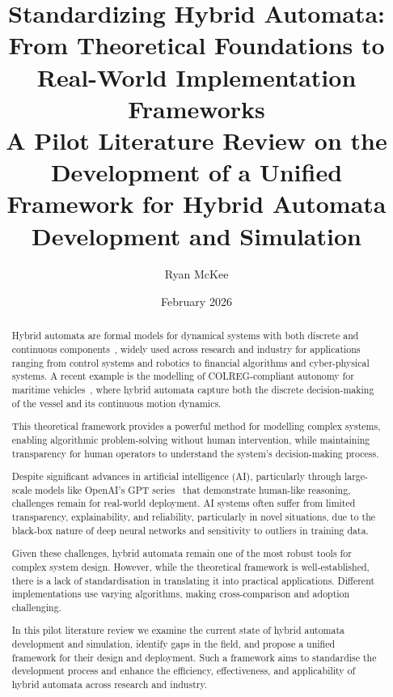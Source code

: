 \documentclass[a4paper, 12pt]{report}
\title{
    Standardizing Hybrid Automata: From Theoretical Foundations to Real-World
    Implementation Frameworks\\
    \large A Pilot Literature Review on the Development of a Unified Framework
    for Hybrid Automata Development and Simulation
}
\author{Ryan McKee}
\date{February 2026}
\begin{document}
\maketitle


\begin{abstract}
Hybrid automata are formal models for dynamical systems with both discrete
and continuous components~\cite{Henzinger1996}, widely used across research
and industry for applications ranging from control systems and robotics to
financial algorithms and cyber-physical systems.  A recent example is the
modelling of COLREG-compliant autonomy for maritime vehicles~\cite{SINGH2026123919},
where hybrid automata capture both the discrete decision-making of the vessel
and its continuous motion dynamics.

This theoretical framework provides a powerful method for modelling complex
systems, enabling algorithmic problem-solving without human intervention,
while maintaining transparency for human operators to understand the
system's decision-making process.

Despite significant advances in artificial intelligence (AI), particularly
through large-scale models like OpenAI's GPT series~\cite{openai} that
demonstrate human-like reasoning, challenges remain for real-world
deployment.  AI systems often suffer from limited transparency,
explainability, and reliability, particularly in novel situations, due to
the black-box nature of deep neural networks and sensitivity to outliers in
training data.

Given these challenges, hybrid automata remain one of the most robust tools
for complex system design.  However, while the theoretical framework is
well-established, there is a lack of standardisation in translating it into
practical applications.  Different implementations use varying algorithms,
making cross-comparison and adoption challenging.

In this pilot literature review we examine the current state of hybrid
automata development and simulation, identify gaps in the field, and propose
a unified framework for their design and deployment.  Such a framework aims
to standardise the development process and enhance the efficiency,
effectiveness, and applicability of hybrid automata across research and
industry.
\end{abstract}

\end{document}
